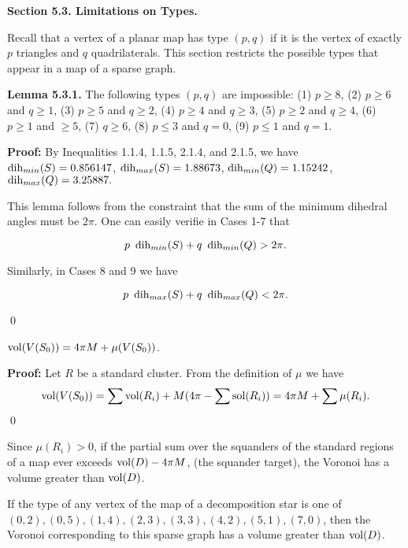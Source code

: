 \bigskip

{\bf Section 5.3. Limitations on Types.}

\bigskip

Recall that a vertex of a planar map has type $(p,q)$ if it is the vertex of exactly $p$ triangles and $q$ quadrilaterals.  This section restricts the possible types that appear in a map of a sparse graph.  


{\bf Lemma 5.3.1.} The following types $(p,q)$ are impossible: (1) $p\geq 8$, (2) $p\geq6$ and $q \geq 1$, (3) $p \geq 5$ and $q\geq 2$, (4) $p\geq 4$ and $q \geq 3$, (5) $p \geq 2$ and $q \geq 4$, (6) $p\ge 1$ and $\ge 5$, (7) $q \geq 6$, (8) $p \leq 3$ and $q=0$, (9) $p \leq 1$ and $q=1$. 

{\bf Proof:}  By Inequalities 1.1.4, 1.1.5, 2.1.4, and  2.1.5,  we have\newline
$\operatorname{dih}_{min}(S)=0.856147$, \newline
$\operatorname{dih}_{max}(S)=1.88673$, \newline
$\operatorname{dih}_{min}(Q)=1.15242$, \newline
$\operatorname{dih}_{max}(Q)=3.25887.$ \newline

  This lemma follows from the constraint that the sum of the minimum dihedral angles must be $2 \pi$.  One can easily verifie in Cases 1-7 that 

$$p\ \dih_{min}(S)  + q\ \dih_{min}(Q)  > 2 \pi.$$  

Similarly, in Cases 8 and 9 we have 

$$p\ \dih_{max}(S)  + q\ \dih_{max}(Q)  < 2 \pi.$$
 
\qed

 $\operatorname{vol}(V(S_0))=4 \pi M + \mu(V(S_0))$. \endproclaim

{\bf Proof:} Let $R$ be a standard cluster.  From the definition of $\mu$ we have $$\operatorname{vol}(V(S_0))=\sum \operatorname{vol}(R_i)+ M (4\pi - \sum \operatorname{sol}(R_i)) = 4 \pi M + \sum \mu(R_i).$$ \qed

Since $\mu(R_i) > 0$, if the partial sum over the squanders of the standard regions of a map ever exceeds $\operatorname{vol}(D)-4\pi M$, (the squander target), the Voronoi has a volume greater than $\operatorname{vol}(D)$.  

\bigskip

 If the type of any vertex of the map of a decomposition star is one of $(0,2), (0,5), (1,4), (2,3), (3,3), (4,2),(5,1), (7,0)$, then the Voronoi corresponding to this sparse graph has a volume greater than $\operatorname{vol}(D)$. \endproclaim

